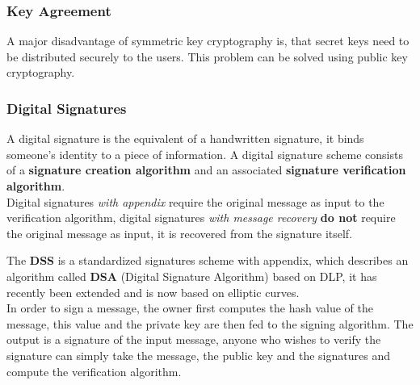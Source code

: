 \documentclass[a4paper, 10 pt, conference]{ieeeconf}
\begin{document}
\vspace{0.5cm}
\subsubsection{\textbf{Key Agreement}}
A major disadvantage of symmetric key cryptography is, that secret keys need to be distributed securely to the users. This problem can be solved using public key cryptography.


\vspace{0.5cm}
\subsubsection{\textbf{Digital Signatures}}
A digital signature is the equivalent of a handwritten signature, it binds someone's identity to a piece of information. A digital signature scheme consists of a \textbf{signature creation algorithm} and an associated \textbf{signature verification algorithm}. \\
Digital signatures \emph{with appendix} require the original message as input to the verification algorithm, digital signatures \emph{with message recovery} \textbf{do not} require the original message as input, it is recovered from the signature itself. 

The \textbf{DSS} is a standardized signatures scheme with appendix, which describes an algorithm called \textbf{DSA} (Digital Signature Algorithm) based on DLP, it has recently been extended and is now based on elliptic curves. \\
In order to sign a message, the owner first computes the hash value of the message, this value and the private key are then fed to the signing algorithm. 
The output is a signature of the input message, anyone who wishes to verify the signature can simply take the message, the public key and the signatures and compute the verification algorithm. 
\end{document}

